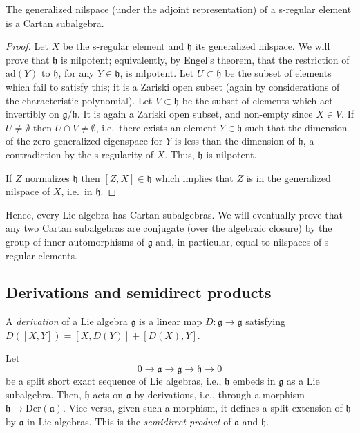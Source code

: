 \begin{proposition}
\label{proposition-CSA-centralizer}
 The generalized nilspace (under the adjoint representation) of a s-regular element is a Cartan subalgebra.
\end{proposition}

\begin{proof}
 Let $X$ be the s-regular element and $\mathfrak h$ its generalized nilspace. We will prove that $\mathfrak h$ is nilpotent; equivalently, by Engel's theorem, that the restriction of $\text{ad}(Y)$ to $\mathfrak h$, for any $Y\in\mathfrak h$, is nilpotent. Let $U\subset\mathfrak h$ be the subset of elements which fail to satisfy this; it is a Zariski open subset (again by considerations of the characteristic polynomial). Let $V\subset\mathfrak h$ be the subset of elements which act invertibly on $\mathfrak g/\mathfrak h$. It is again a Zariski open subset, and non-empty since $X\in V$. If $U\ne\emptyset$ then $U\cap V\ne\emptyset$, i.e.\ there exists an element $Y\in\mathfrak h$ such that the dimension of the zero generalized eigenspace for $Y$ is less than the dimension of $\mathfrak h$, a contradiction by the s-regularity of $X$. Thus, $\mathfrak h$ is nilpotent.

 If $Z$ normalizes $\mathfrak h$ then $[Z,X]\in\mathfrak h$ which implies that $Z$ is in the generalized nilspace of $X$, i.e.\ in $\mathfrak h$.
\end{proof}

Hence, every Lie algebra has Cartan subalgebras. We will eventually prove that any two Cartan subalgebras are conjugate (over the algebraic closure) by the group of inner automorphisms of $\mathfrak g$ and, in particular, equal to nilspaces of s-regular elements.



\subsection{Derivations and semidirect products}
\label{subsection-derivations-semidirect}

\begin{definition}
\label{definition-derivation-Liealgebra}
 A \emph{derivation} of a Lie algebra $\mathfrak g$ is a linear map $D:\mathfrak g\to\mathfrak g$ satisfying $D([X,Y])=[X,D(Y)]+[D(X),Y]$.
\end{definition}

Let 
$$0 \to  \mathfrak a \to \mathfrak g \to \mathfrak h \to 0$$ be a split short exact sequence of Lie algebras, i.e., $\mathfrak h$ embeds in $\mathfrak g$ as a Lie subalgebra. Then, $\mathfrak h$ acts on $\mathfrak a$ by derivations, i.e., through a morphism $\mathfrak h\to \text{Der}(\mathfrak a)$. Vice versa, given such a morphism, it defines a split extension of $\mathfrak h$ by $\mathfrak a$ in Lie algebras. This is the {\it semidirect product} of $\mathfrak a$ and $\mathfrak h$.



